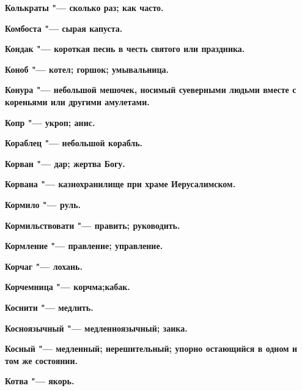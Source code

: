 \begin{mymulticols}{2}
\bfseries Колькраты\normalfont{} "--- сколько раз; как часто. 




\bfseries Комбоста\normalfont{} "--- сырая капуста. 




\bfseries Кондак\normalfont{} "--- короткая песнь в честь святого или праздника. 




\bfseries Коноб\normalfont{} "--- котел; горшок; умывальница. 




\bfseries Конура\normalfont{} "--- небольшой мешочек, носимый суеверными людьми вместе с кореньями или другими амулетами. 




\bfseries Копр\normalfont{} "--- укроп; анис. 




\bfseries Кораблец\normalfont{} "--- небольшой корабль. 




\bfseries Корван\normalfont{} "--- дар; жертва Богу. 




\bfseries Корвана\normalfont{} "--- казнохранилище при храме Иерусалимском. 




\bfseries Кормило\normalfont{} "--- руль. 




\bfseries Кормильствовати\normalfont{} "--- править; руководить. 




\bfseries Кормление\normalfont{} "--- правление; управление. 




\bfseries Корчаг\normalfont{} "--- лохань. 




\bfseries Корчемница\normalfont{} "--- корчма;кабак. 




\bfseries Коснити\normalfont{} "--- медлить. 




\bfseries Косноязычный\normalfont{} "--- медленноязычный; заика. 




\bfseries Косный\normalfont{} "--- медленный; нерешительный; упорно остающийся в одном и том же состоянии. 




\bfseries Котва\normalfont{} "--- якорь. 





\end{mymulticols}
